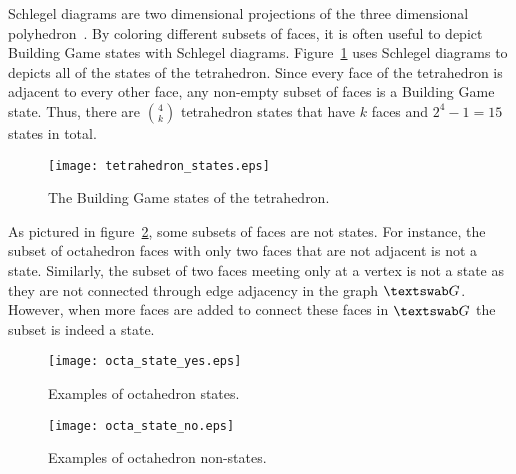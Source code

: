 Schlegel diagrams are two dimensional projections of the three dimensional polyhedron~\cite{Sommerville1929}. By coloring different subsets of faces, it is often useful to depict Building Game states with Schlegel diagrams.  Figure~\ref{fig:TetraStates} uses Schlegel diagrams to depicts all of the states of the tetrahedron. Since every face of the tetrahedron is adjacent to every other face, any non-empty subset of faces is a Building Game state. Thus, there are ${4 \choose k}$ tetrahedron states that have $k$ faces and $2^4 - 1 = 15$ states in total. 
\begin{figure}[ht]
\centering
  \texttt{[image: tetrahedron\_states.eps]}
\caption{The Building Game states of the tetrahedron.}
\label{fig:TetraStates}
\end{figure}
As pictured in figure~\ref{fig:OctaStates}, some subsets of faces are not states. For instance, the subset of octahedron faces with only two faces that are not adjacent is not a state. Similarly, the subset of two faces meeting only at a vertex is not a state as they are not connected through edge adjacency in the graph $\PolyGraph$. However, when more faces are added to connect these faces in $\PolyGraph$ the subset is indeed a state.

\begin{figure}[ht]
        \centering
  \texttt{[image: octa\_state\_yes.eps]}
\caption{Examples of octahedron states.}
  \texttt{[image: octa\_state\_no.eps]}
\caption{Examples of octahedron non-states.}
\label{fig:OctaStates}
\end{figure}
 


 


